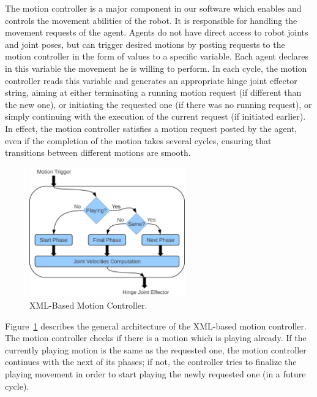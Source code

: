 The motion controller is a major component in our software which enables and controls the movement abilities of the robot. It is responsible for handling the movement requests of the agent. Agents do not have direct access to robot joints and joint poses, but can trigger desired motions by posting requests to the motion controller in the form of values to a specific variable. Each agent declares in this variable the movement he is willing to perform. In each cycle, the motion controller reads this variable and generates an appropriate hinge joint effector string, aiming at either terminating a running motion request (if different than the new one), or initiating the requested one (if there was no running request), or simply continuing with the execution of the current request (if initiated earlier). In effect, the motion controller satisfies a motion request posted by the agent, even if the completion of the motion takes several cycles, ensuring that transitions between different motions are smooth. 


\begin{figure}[t!]
\centering
  \includegraphics[width=0.6\textwidth]{Chapter3/figures/MotionController.pdf}
  \caption{XML-Based Motion Controller.}
  \label{fig:MotionController}
\end{figure}


Figure~\ref{fig:MotionController} describes the general architecture of the XML-based motion controller. The motion controller checks if there is a motion which is playing already. If the currently playing motion is the same as the requested one, the motion controller continues with the next of its phases; if not, the controller tries to finalize the playing movement in order to start playing the newly requested one (in a future cycle).


